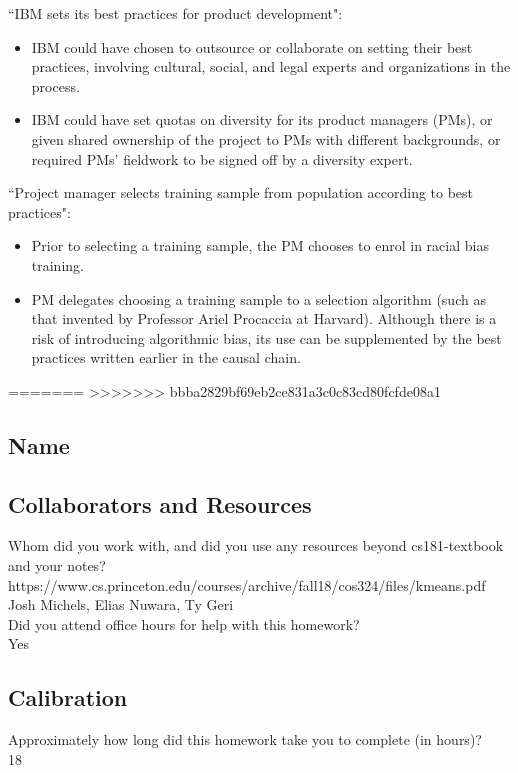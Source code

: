 \documentclass[submit]{harvardml}
\begin{document}
``IBM sets its best practices for product development":
\begin{itemize}
  \item IBM could have chosen to outsource or collaborate on setting their best practices, involving cultural, social, and legal experts and organizations in the process.
  \item IBM could have set quotas on diversity for its product managers (PMs), or given shared ownership of the project to PMs with different backgrounds, or required PMs' fieldwork to be signed off by a diversity expert.
\end{itemize}
``Project manager selects training sample from population according to best practices":
\begin{itemize}
    \item Prior to selecting a training sample, the PM chooses to enrol in racial bias training.
    \item PM delegates choosing a training sample to a selection algorithm (such as that invented by Professor Ariel Procaccia at Harvard). Although there is a risk of introducing algorithmic bias, its use can be supplemented by the best practices written earlier in the causal chain.
\end{itemize}

=======
>>>>>>> bbba2829bf69eb2ce831a3c0c83cd80fcfde08a1
\newpage
\subsection*{Name}
\subsection*{Collaborators and Resources}
Whom did you work with, and did you use any resources beyond cs181-textbook and your notes?\\
https://www.cs.princeton.edu/courses/archive/fall18/cos324/files/kmeans.pdf\\
Josh Michels, Elias Nuwara, Ty Geri\\

Did you attend office hours for help with this homework?\\
Yes

\subsection*{Calibration}
Approximately how long did this homework take you to complete (in hours)?\\
18
\end{document}

